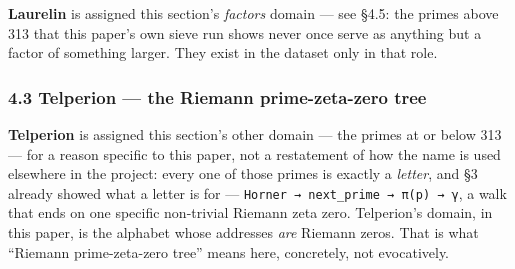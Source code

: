 \documentclass[
  10pt,
]{article}
\begin{document}
\textbf{Laurelin} is assigned this section's \emph{factors} domain ---
see §4.5: the primes above 313 that this paper's own sieve run shows
never once serve as anything but a factor of something larger. They
exist in the dataset only in that role.

\hypertarget{telperion-the-riemann-prime-zeta-zero-tree}{%
\subsubsection{4.3 Telperion --- the Riemann prime-zeta-zero
tree}\label{telperion-the-riemann-prime-zeta-zero-tree}}

\textbf{Telperion} is assigned this section's other domain --- the
primes at or below 313 --- for a reason specific to this paper, not a
restatement of how the name is used elsewhere in the project: every one
of those primes is exactly a \emph{letter}, and §3 already showed what a
letter is for --- \texttt{Horner\ →\ next\_prime\ →\ π(p)\ →\ γ}, a walk
that ends on one specific non-trivial Riemann zeta zero. Telperion's
domain, in this paper, is the alphabet whose addresses \emph{are}
Riemann zeros. That is what ``Riemann prime-zeta-zero tree'' means here,
concretely, not evocatively.
\end{document}
